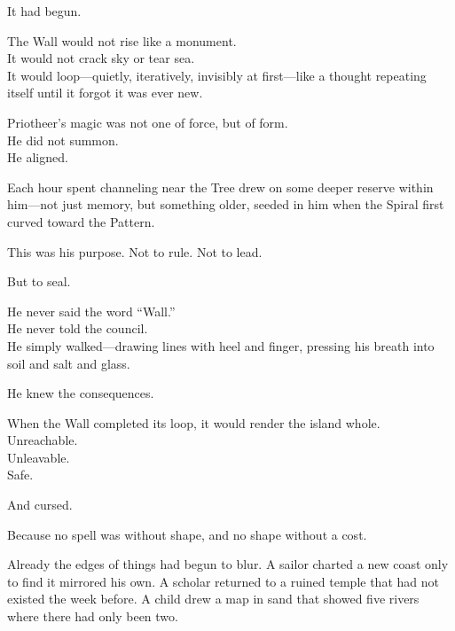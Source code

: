 \documentclass[12pt]{article}
\begin{document}
\vspace{0.5em}
It had begun.

\vspace{0.5em}
The Wall would not rise like a monument.\\
It would not crack sky or tear sea.\\
It would loop---quietly, iteratively, invisibly at first---like a thought repeating itself until it forgot it was ever new.

\vspace{0.5em}
Priotheer’s magic was not one of force, but of form.\\
He did not summon.\\
He aligned.

\vspace{0.5em}
Each hour spent channeling near the Tree drew on some deeper reserve within him---not just memory, but something older, seeded in him when the Spiral first curved toward the Pattern.

\vspace{0.5em}
This was his purpose. Not to rule. Not to lead.

\vspace{0.5em}
But to seal.

\vspace{0.5em}
He never said the word ``Wall.''\\
He never told the council.\\
He simply walked---drawing lines with heel and finger, pressing his breath into soil and salt and glass.

\vspace{0.5em}
He knew the consequences.

\vspace{0.5em}
When the Wall completed its loop, it would render the island whole.\\
Unreachable.\\
Unleavable.\\
Safe.

\vspace{0.5em}
And cursed.

\vspace{0.5em}
Because no spell was without shape, and no shape without a cost.

\vspace{0.5em}
Already the edges of things had begun to blur. A sailor charted a new coast only to find it mirrored his own. A scholar returned to a ruined temple that had not existed the week before. A child drew a map in sand that showed five rivers where there had only been two.
\end{document}
